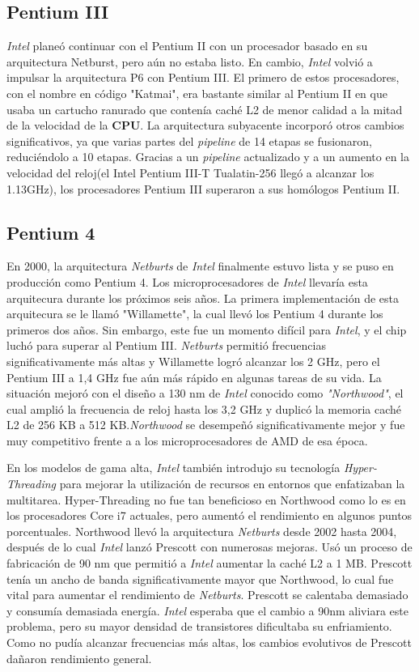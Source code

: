 \subsection{Pentium III}
\emph{Intel} planeó continuar con el Pentium II con un procesador basado en su arquitectura Netburst, pero aún no estaba listo. En cambio, \emph{Intel} volvió a impulsar la 
arquitectura P6 con Pentium III. El primero de estos procesadores, con el nombre en código "Katmai", era bastante similar al Pentium II en que usaba un cartucho 
ranurado que contenía caché L2 de menor calidad a la mitad de la velocidad de la \textbf{CPU}. La arquitectura subyacente incorporó otros cambios significativos, ya que varias 
partes del \emph{pipeline} de 14 etapas se fusionaron, reduciéndolo a 10 etapas. Gracias a un \emph{pipeline} actualizado y a un aumento en la velocidad del 
reloj(el Intel Pentium III-T Tualatin-256 llegó a alcanzar los 1.13GHz), los procesadores Pentium III superaron a sus homólogos Pentium II.

\subsection{Pentium 4}
En 2000, la arquitectura \emph{Netburts} de \emph{Intel} finalmente estuvo lista y se puso en producción como Pentium 4. Los microprocesadores de \emph{Intel} llevaría esta 
arquitecura durante los próximos seis años. La primera implementación de esta arquitecura se le llamó "Willamette", la cual llevó los Pentium 4 
durante los primeros dos años. Sin embargo, este fue un momento difícil para \emph{Intel}, y el chip luchó para superar al Pentium III. \emph{Netburts} permitió 
frecuencias significativamente más altas y Willamette logró alcanzar los 2 GHz, pero el Pentium III a 1,4 GHz fue aún más rápido en algunas tareas
de su vida. La situación mejoró con el diseño a 130 nm de \emph{Intel} conocido como \emph{"Northwood"}, el cual  amplió la frecuencia de reloj hasta los 3,2 GHz y 
duplicó la memoria caché L2 de 256 KB a 512 KB.\emph{Northwood} se desempeñó significativamente mejor y fue muy competitivo frente a a los microprocesadores 
de AMD de esa época.

En los modelos de gama alta, \emph{Intel} también introdujo su tecnología \emph{Hyper-Threading} para mejorar la utilización de recursos en entornos que 
enfatizaban la multitarea. Hyper-Threading no fue tan beneficioso en Northwood como lo es en los procesadores Core i7 actuales, pero aumentó el 
rendimiento en algunos puntos porcentuales.
Northwood llevó la arquitectura \emph{Netburts} desde 2002 hasta 2004, después de lo cual \emph{Intel} lanzó Prescott con numerosas mejoras. Usó un proceso de 
fabricación de 90 nm que permitió a \emph{Intel} aumentar la caché L2 a 1 MB.  Prescott tenía un ancho de banda significativamente mayor que Northwood, 
lo cual fue vital para aumentar el rendimiento de \emph{Netburts}. Prescott se calentaba  demasiado y consumía demasiada energía. \emph{Intel} esperaba que el 
cambio a 90nm aliviara este problema, pero su mayor densidad de transistores dificultaba su enfriamiento. Como no pudía alcanzar frecuencias más altas, 
los cambios evolutivos de Prescott dañaron  rendimiento general.

